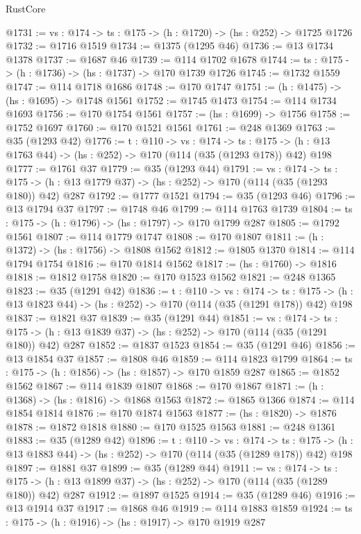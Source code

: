 \begin{lexlean}{RustCore}
\begin{coremodule}
@1731 := {vs : @174} -> {ts : @175} -> (h : @1720) -> (hs : @252) -> @1725 @1726
@1732 := @1716 @1519
@1734 := @1375 (@1295 @46)
@1736 := @13 @1734 @1378
@1737 := @1687 @46
@1739 := @114 @1702 @1678
@1744 := {ts : @175} -> (h : @1736) -> (hs : @1737) -> @170 @1739 @1726
@1745 := @1732 @1559
@1747 := @114 @1718 @1686
@1748 := @170 @1747
@1751 := (h : @1475) -> (hs : @1695) -> @1748 @1561
@1752 := @1745 @1473
@1754 := @114 @1734 @1693
@1756 := @170 @1754 @1561
@1757 := (hs : @1699) -> @1756
@1758 := @1752 @1697
@1760 := @170 @1521 @1561
@1761 := @248 @1369
@1763 := @35 (@1293 @42)
@1776 := {t : @110} ->
  {vs : @174} ->
  {ts : @175} -> (h : @13 @1763 @44) -> (hs : @252) -> @170 (@114 (@35 (@1293 @178)) @42) @198
@1777 := @1761 @37
@1779 := @35 (@1293 @44)
@1791 := {vs : @174} ->
  {ts : @175} -> (h : @13 @1779 @37) -> (hs : @252) -> @170 (@114 (@35 (@1293 @180)) @42) @287
@1792 := @1777 @1521
@1794 := @35 (@1293 @46)
@1796 := @13 @1794 @37
@1797 := @1748 @46
@1799 := @114 @1763 @1739
@1804 := {ts : @175} -> (h : @1796) -> (hs : @1797) -> @170 @1799 @287
@1805 := @1792 @1561
@1807 := @114 @1779 @1747
@1808 := @170 @1807
@1811 := (h : @1372) -> (hs : @1756) -> @1808 @1562
@1812 := @1805 @1370
@1814 := @114 @1794 @1754
@1816 := @170 @1814 @1562
@1817 := (hs : @1760) -> @1816
@1818 := @1812 @1758
@1820 := @170 @1523 @1562
@1821 := @248 @1365
@1823 := @35 (@1291 @42)
@1836 := {t : @110} ->
  {vs : @174} ->
  {ts : @175} -> (h : @13 @1823 @44) -> (hs : @252) -> @170 (@114 (@35 (@1291 @178)) @42) @198
@1837 := @1821 @37
@1839 := @35 (@1291 @44)
@1851 := {vs : @174} ->
  {ts : @175} -> (h : @13 @1839 @37) -> (hs : @252) -> @170 (@114 (@35 (@1291 @180)) @42) @287
@1852 := @1837 @1523
@1854 := @35 (@1291 @46)
@1856 := @13 @1854 @37
@1857 := @1808 @46
@1859 := @114 @1823 @1799
@1864 := {ts : @175} -> (h : @1856) -> (hs : @1857) -> @170 @1859 @287
@1865 := @1852 @1562
@1867 := @114 @1839 @1807
@1868 := @170 @1867
@1871 := (h : @1368) -> (hs : @1816) -> @1868 @1563
@1872 := @1865 @1366
@1874 := @114 @1854 @1814
@1876 := @170 @1874 @1563
@1877 := (hs : @1820) -> @1876
@1878 := @1872 @1818
@1880 := @170 @1525 @1563
@1881 := @248 @1361
@1883 := @35 (@1289 @42)
@1896 := {t : @110} ->
  {vs : @174} ->
  {ts : @175} -> (h : @13 @1883 @44) -> (hs : @252) -> @170 (@114 (@35 (@1289 @178)) @42) @198
@1897 := @1881 @37
@1899 := @35 (@1289 @44)
@1911 := {vs : @174} ->
  {ts : @175} -> (h : @13 @1899 @37) -> (hs : @252) -> @170 (@114 (@35 (@1289 @180)) @42) @287
@1912 := @1897 @1525
@1914 := @35 (@1289 @46)
@1916 := @13 @1914 @37
@1917 := @1868 @46
@1919 := @114 @1883 @1859
@1924 := {ts : @175} -> (h : @1916) -> (hs : @1917) -> @170 @1919 @287

\end{coremodule}
\end{lexlean}
